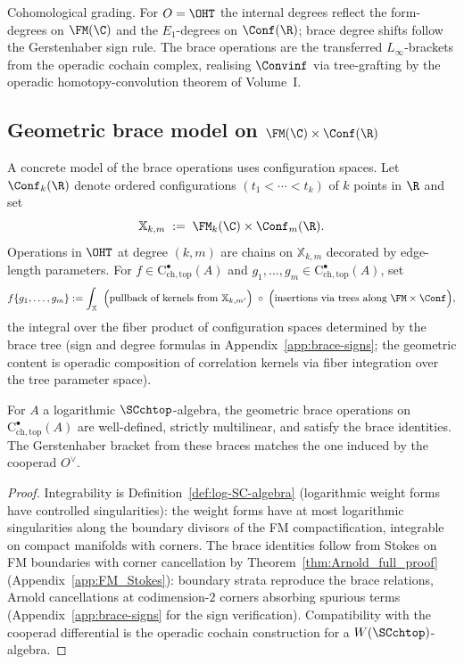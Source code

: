 \begin{remark}
Cohomological grading. For $O=\OHT$ the internal degrees reflect the form-degrees on $\FM(\C)$ and the $E_1$-degrees on $\Conf(\R)$; brace degree shifts follow the Gerstenhaber sign rule.
The brace operations are the transferred $L_\infty$-brackets
from the operadic cochain complex, realising $\Convinf$ via tree-grafting
by the operadic homotopy-convolution theorem of Volume~I.
\end{remark}

\subsection{\texorpdfstring{Geometric brace model on $\FM(\C)\times\Conf(\R)$}{Geometric brace model on FM(C) x Conf(R)}}
\label{subsec:geometric-brace-expanded}
A concrete model of the brace operations uses configuration spaces.
Let $\Conf_k(\R)$ denote ordered configurations $(t_1<\cdots<t_k)$ of $k$ points in $\R$ and set
\[
\mathbb{X}_{k,m} \;:=\; \FM_k(\C)\times \Conf_m(\R).
\]
Operations in $\OHT$ at degree $(k,m)$ are chains on $\mathbb{X}_{k,m}$ decorated by edge-length parameters.
For $f\in \mathrm{C}^\bullet_{\mathrm{ch,top}}(A)$ and $g_1,\dots,g_m\in \mathrm{C}^\bullet_{\mathrm{ch,top}}(A)$, set
\[
f\{g_1,\dots,g_m\} := \int_{\mathbb{X}} \;\;\Bigl(\text{pullback of kernels from } \mathbb{X}_{k,m'} \Bigr)\;\circ\;\Bigl(\text{insertions via trees along } \FM\times \Conf\Bigr),
\]
the integral over the fiber product of configuration spaces determined by the brace tree (sign and degree formulas in Appendix~\ref{app:brace-signs}; the geometric content is operadic composition of correlation kernels via fiber integration over the tree parameter space).

\begin{proposition}
\label{prop:geometric-braces-well-defined-brace}
For $A$ a logarithmic $\SCchtop$-algebra, the geometric brace operations on $\mathrm{C}^\bullet_{\mathrm{ch,top}}(A)$ are well-defined, strictly multilinear, and satisfy the brace identities. The Gerstenhaber bracket from these braces matches the one induced by the cooperad $O^\vee$.
\end{proposition}

\begin{proof}
Integrability is Definition~\ref{def:log-SC-algebra} (logarithmic weight forms have controlled singularities): the weight forms have at most logarithmic singularities along the boundary divisors of the FM compactification, integrable on compact manifolds with corners. The brace identities follow from Stokes on FM boundaries with corner cancellation by Theorem~\ref{thm:Arnold_full_proof} (Appendix~\ref{app:FM_Stokes}): boundary strata reproduce the brace relations, Arnold cancellations at codimension-$2$ corners absorbing spurious terms (Appendix~\ref{app:brace-signs} for the sign verification). Compatibility with the cooperad differential is the operadic cochain construction for a $W(\SCchtop)$-algebra.
\end{proof}

